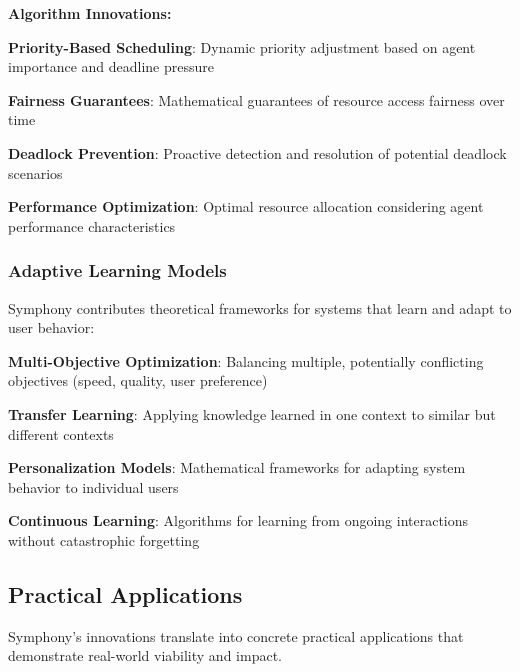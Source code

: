 \begin{successbox}
\begin{alertbox}
\begin{successbox}
\begin{alertbox}
\begin{infobox}[title=Theoretical Framework: AI-First Design Principles]
\begin{successbox}
\textbf{Algorithm Innovations:}

\begin{compactlist}
    \item \textbf{Priority-Based Scheduling}: Dynamic priority adjustment based on agent importance and deadline pressure
    \item \textbf{Fairness Guarantees}: Mathematical guarantees of resource access fairness over time
    \item \textbf{Deadlock Prevention}: Proactive detection and resolution of potential deadlock scenarios
    \item \textbf{Performance Optimization}: Optimal resource allocation considering agent performance characteristics
\end{compactlist}

\subsubsection{Adaptive Learning Models}

Symphony contributes theoretical frameworks for systems that learn and adapt to user behavior:

\begin{expandedlist}
    \item \textbf{Multi-Objective Optimization}: Balancing multiple, potentially conflicting objectives (speed, quality, user preference)
    
    \item \textbf{Transfer Learning}: Applying knowledge learned in one context to similar but different contexts
    
    \item \textbf{Personalization Models}: Mathematical frameworks for adapting system behavior to individual users
    
    \item \textbf{Continuous Learning}: Algorithms for learning from ongoing interactions without catastrophic forgetting
\end{expandedlist}

\subsection{Practical Applications}
\label{subsec:practical-applications}

Symphony's innovations translate into concrete practical applications that demonstrate real-world viability and impact.


\end{successbox}
\end{infobox}
\end{alertbox}
\end{successbox}
\end{alertbox}
\end{successbox}
